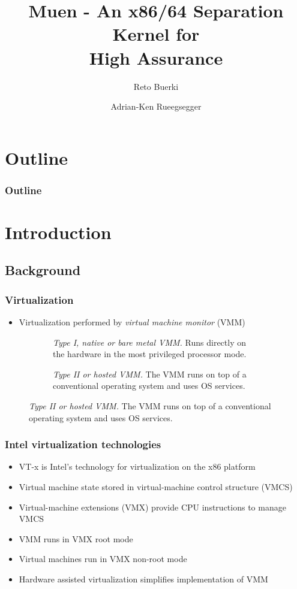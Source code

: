 \documentclass[xcolor={dvipsnames}]{beamer}
\title[Muen Separation Kernel]{Muen - An x86/64 Separation Kernel for\\High Assurance}
\author{Reto Buerki \and Adrian-Ken Rueegsegger}
\institute[HSR]
{
	Institute for Internet Technologies and Applications\\
	University of Applied Sciences Rapperswil
}
\begin{document}


\begin{frame}
	\titlepage
\end{frame}

\section*{Outline}
\begin{frame}
	\frametitle{Outline}\tableofcontents
\end{frame}

\section{Introduction}
\subsection{Background}
\begin{frame}\frametitle{Virtualization}
\begin{itemize}
	\item Virtualization performed by \emph{virtual machine monitor} (VMM)
\end{itemize}

\begin{figure}[h!]
	\centering
	\begin{subfigure}[b]{0.4\textwidth}
		\centering
		
		\caption{\emph{Type I, native or bare metal VMM.} Runs directly on the
		hardware in the most privileged processor mode.}
	\end{subfigure}
	\qquad
	\begin{subfigure}[b]{0.4\textwidth}
		\centering
		
		\caption{\emph{Type II or hosted VMM.} The VMM runs on top of a
		conventional operating system and uses OS services.}
	\end{subfigure}
\end{figure}
\end{frame}

\begin{frame}\frametitle{Intel virtualization technologies}
\begin{itemize}
	\item VT-x is Intel's technology for virtualization on the x86 platform
	\item Virtual machine state stored in virtual-machine control structure (VMCS)
	\item Virtual-machine extensions (VMX) provide CPU instructions to manage VMCS
	\item VMM runs in VMX root mode
	\item Virtual machines run in VMX non-root mode
	\item Hardware assisted virtualization simplifies implementation of VMM
\end{itemize}
\end{frame}
\end{document}
